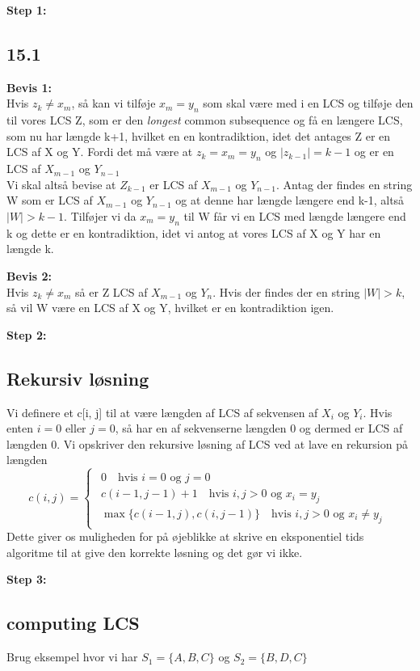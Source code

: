 \documentclass[11pt,a4paper]{report}
\theoremstyle{plain}
\theoremstyle{definition}
\theoremstyle{remark}
\numberwithin{equation}{section}
\begin{document}
\textbf{Step 1:}
\subsection{15.1}

\textbf{Bevis 1:}\\
Hvis $z_k \neq x_m$, så kan vi tilføje $x_m = y_n$ som skal være med i en LCS og tilføje den til vores LCS Z, som er den \emph{longest} common subsequence og få en længere LCS, som nu har længde k+1, hvilket en en kontradiktion, idet det antages Z er en LCS af X og Y. Fordi det må være at $z_k = x_m = y_n$ og $|z_{k-1}| = k-1$ og er en LCS af $X_{m-1}$ og $Y_{n-1}$\\
Vi skal altså bevise at $Z_{k-1}$ er LCS af $X_{m-1}$ og $Y_{n-1}$. Antag der findes en string W som er LCS af $X_{m-1}$ og $Y_{n-1}$ og at denne har længde længere end k-1, altså $|W|>k-1$. Tilføjer vi da $x_m=y_n$ til W får vi en LCS med længde længere end k og dette er en kontradiktion, idet vi antog at vores LCS af X og Y har en længde k.

\textbf{Bevis 2:}\\
Hvis $z_k \neq x_m$ så er Z LCS af $X_{m-1}$ og $Y_n$. Hvis der findes der en string $|W|>k$, så vil W være en LCS af X og Y, hvilket er en kontradiktion igen.

\textbf{Step 2:}
\subsection{Rekursiv løsning}
Vi definere et c[i, j] til at være længden af LCS af sekvensen af $X_i$ og $Y_i$. Hvis enten $i = 0$ eller $j = 0$, så har en af sekvenserne længden 0 og dermed er LCS af længden 0. Vi opskriver den rekursive løsning af LCS ved at lave en rekursion på længden
\[
c(i,j) =
    \begin{cases}
        \begin{array}{c}
            0 \quad \text{hvis } i =  0 \text{ og } j = 0 \\
            c(i-1, j-1) +1 \quad \text{hvis } i,j > 0 \text{ og } x_i = y_j \\
            \max\{c(i-1, j), c(i, j-1)\} \quad \text{hvis } i,j > 0 \text{ og } x_i \neq y_j
        \end{array}
    \end{cases}
\]
Dette giver os muligheden for på øjeblikke at skrive en eksponentiel tids algoritme til at give den korrekte løsning og det gør vi ikke.

\textbf{Step 3:}
\subsection{computing LCS}
Brug eksempel hvor vi har $S_1 = \{A, B, C\}$ og $S_2 = \{B, D, C\}$
\end{document}

